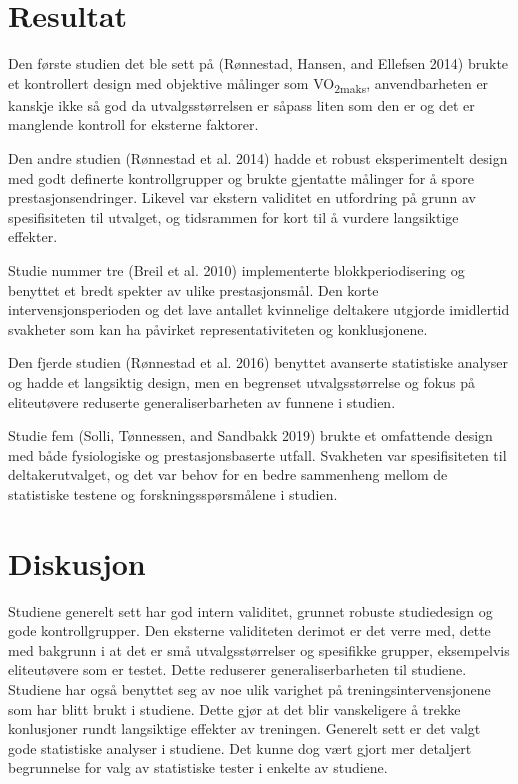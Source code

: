 \documentclass[
  letterpaper,
  DIV=11,
  numbers=noendperiod]{scrreprt}
\begin{document}
\section{Resultat}\label{resultat-4}

Den første studien det ble sett på (Rønnestad, Hansen, and Ellefsen
2014) brukte et kontrollert design med objektive målinger som
VO\textsubscript{2maks}, anvendbarheten er kanskje ikke så god da
utvalgsstørrelsen er såpass liten som den er og det er manglende
kontroll for eksterne faktorer.

Den andre studien (Rønnestad et al. 2014) hadde et robust eksperimentelt
design med godt definerte kontrollgrupper og brukte gjentatte målinger
for å spore prestasjonsendringer. Likevel var ekstern validitet en
utfordring på grunn av spesifisiteten til utvalget, og tidsrammen for
kort til å vurdere langsiktige effekter.

Studie nummer tre (Breil et al. 2010) implementerte blokkperiodisering
og benyttet et bredt spekter av ulike prestasjonsmål. Den korte
intervensjonsperioden og det lave antallet kvinnelige deltakere utgjorde
imidlertid svakheter som kan ha påvirket representativiteten og
konklusjonene.

Den fjerde studien (Rønnestad et al. 2016) benyttet avanserte
statistiske analyser og hadde et langsiktig design, men en begrenset
utvalgsstørrelse og fokus på eliteutøvere reduserte generaliserbarheten
av funnene i studien.

Studie fem (Solli, Tønnessen, and Sandbakk 2019) brukte et omfattende
design med både fysiologiske og prestasjonsbaserte utfall. Svakheten var
spesifisiteten til deltakerutvalget, og det var behov for en bedre
sammenheng mellom de statistiske testene og forskningsspørsmålene i
studien.

\section{Diskusjon}\label{diskusjon-4}

Studiene generelt sett har god intern validitet, grunnet robuste
studiedesign og gode kontrollgrupper. Den eksterne validiteten derimot
er det verre med, dette med bakgrunn i at det er små utvalgsstørrelser
og spesifikke grupper, eksempelvis eliteutøvere som er testet. Dette
reduserer generaliserbarheten til studiene. Studiene har også benyttet
seg av noe ulik varighet på treningsintervensjonene som har blitt brukt
i studiene. Dette gjør at det blir vanskeligere å trekke konlusjoner
rundt langsiktige effekter av treningen. Generelt sett er det valgt gode
statistiske analyser i studiene. Det kunne dog vært gjort mer detaljert
begrunnelse for valg av statistiske tester i enkelte av studiene.
\end{document}
